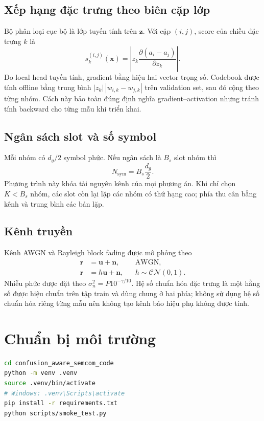 \documentclass[11pt,journal,onecolumn]{IEEEtran}
\newcommand{\vect}[1]{\boldsymbol{#1}}
\newcommand{\nsym}{N_{\mathrm{sym}}}
\begin{document}
\subsection{Xếp hạng đặc trưng theo biên cặp lớp}
Bộ phân loại cục bộ là lớp tuyến tính trên $\vect{z}$. Với cặp $(i,j)$, score của chiều đặc trưng $k$ là
\begin{equation}
s_k^{(i,j)}(\vect{x})=
\left|z_k\frac{\partial(a_i-a_j)}{\partial z_k}\right|.
\end{equation}
Do local head tuyến tính, gradient bằng hiệu hai vector trọng số. Codebook được tính offline bằng trung bình $|z_k|\,|w_{i,k}-w_{j,k}|$ trên validation set, sau đó cộng theo từng nhóm. Cách này bảo toàn đúng định nghĩa gradient--activation nhưng tránh tính backward cho từng mẫu khi triển khai.

\subsection{Ngân sách slot và số symbol}
Mỗi nhóm có $d_g/2$ symbol phức. Nếu ngân sách là $B_s$ slot nhóm thì
\begin{equation}
\nsym=B_s\frac{d_g}{2}.
\end{equation}
Phương trình này khóa tài nguyên kênh của mọi phương án. Khi chỉ chọn $K<B_s$ nhóm, các slot còn lại lặp các nhóm có thứ hạng cao; phía thu cân bằng kênh và trung bình các bản lặp.

\subsection{Kênh truyền}
Kênh AWGN và Rayleigh block fading được mô phỏng theo
\begin{align}
\vect{r}&=\vect{u}+\vect{n}, &&\text{AWGN},\\
\vect{r}&=h\vect{u}+\vect{n}, &&h\sim\mathcal{CN}(0,1).
\end{align}
Nhiễu phức được đặt theo $\sigma_n^2=P10^{-\gamma/10}$. Hệ số chuẩn hóa đặc trưng là một hằng số được hiệu chuẩn trên tập train và dùng chung ở hai phía; không sử dụng hệ số chuẩn hóa riêng từng mẫu nên không tạo kênh báo hiệu phụ không được tính.

\section{Chuẩn bị môi trường}
\begin{lstlisting}[language=bash]
cd confusion_aware_semcom_code
python -m venv .venv
source .venv/bin/activate
# Windows: .venv\Scripts\activate
pip install -r requirements.txt
python scripts/smoke_test.py
\end{lstlisting}
\end{document}

